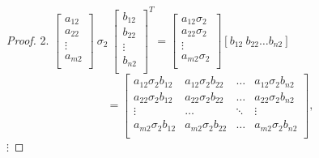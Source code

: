 \documentclass[12pt,a4paper]{report}
\begin{document}
\begin{proof}
2.
$\left[ \begin{array}{c}
         a_{12} \\
         a_{22} \\
         \vdots \\
         a_{m2} \\
         \end{array}
      \right] \: \sigma_{2} \: \left[ \begin{array}{c}
         b_{12} \\
         b_{22} \\
         \vdots \\
         b_{n2} \\
         \end{array}
      \right]^T = \left[
        \begin{array}{c}
         a_{12} \sigma_{2} \\
         a_{22} \sigma_{2} \\
         \vdots \\
         a_{m2} \sigma_{2} \\
         \end{array}
      \right] [b_{12} \: b_{22} \ldots b_{n2}]$
      $$ =  \left[
        \begin{array}{cccc}
         a_{12} \sigma_{2} b_{12}  & a_{12} \sigma_{2} b_{22} & \ldots & a_{12} \sigma_{2} b_{n2}  \\
         a_{22} \sigma_{2} b_{12} & a_{22} \sigma_{2} b_{22} & \ldots & a_{22} \sigma_{2} b_{n2} \\
         \vdots & \ldots & \ddots & \vdots \\
         a_{m2} \sigma_{2} b_{12} & a_{m2} \sigma_{2} b_{22} & \ldots & a_{m2} \sigma_{2} b_{n2} \\
         \end{array}
      \right], $$
$
\vdots
$
      

\end{proof}
\end{document}

